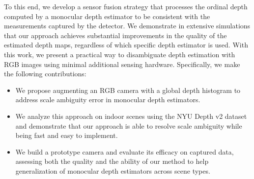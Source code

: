

To this end, we develop a sensor fusion strategy that processes the ordinal
depth computed by a monocular depth estimator to be consistent with the
measurements captured by the  detector. We demonstrate in extensive
simulations that our approach achieves substantial improvements in the quality
of the estimated depth maps, regardless of which specific depth estimator is
used.   With this
work, we present a practical way to disambiguate depth estimation with RGB
images using minimal additional sensing hardware. Specifically, we make the
following contributions:
%
\begin{itemize}
	\item We propose augmenting an RGB camera with a global depth histogram  to address scale ambiguity error in monocular depth estimators.	
  \item We analyze this approach on indoor scenes using the NYU Depth v2 dataset and demonstrate that our approach is able to resolve scale ambiguity while being fast and easy to implement.
	\item We build a prototype camera and evaluate its efficacy on captured data, assessing both the quality and the ability of our method to help generalization of monocular depth estimators across scene types. 
\end{itemize}




